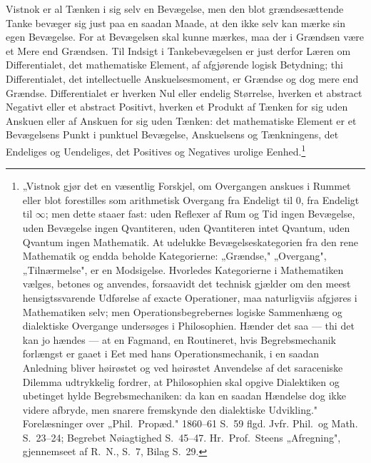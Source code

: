 \documentclass[12pt]{book}
\newcommand{\opage}[1]{\marginnote{\footnotesize\textit{[#1]}}}
\begin{document}
Vistnok er al Tænken i sig selv en Bevægelse, men den blot grændsesættende Tanke
bevæger sig just paa en saadan Maade, at den ikke selv kan mærke sin egen Bevægelse.
For at Bevægelsen skal kunne mærkes, maa der i Grændsen være et Mere end Grændsen. Til
Indsigt i Tankebevægelsen er just derfor Læren om Differentialet, det mathematiske
Element, af afgjørende logisk Betydning; thi Differentialet, det intellectuelle
Anskuelsesmoment, er Grændse og dog mere end Grændse. Differentialet er hverken Nul
eller endelig Størrelse, hverken et abstract Negativt eller et abstract Positivt,
hverken et Produkt af Tænken for sig uden Anskuen eller af Anskuen for sig uden Tænken:
det mathematiske Element er
\opage{23} et Bevægelsens Punkt i punktuel Bevægelse, Anskuelsens og Tænkningens, det Endeliges
og Uendeliges, det Positives og Negatives urolige Eenhed.\footnote{„Vistnok gjør det
en væsentlig Forskjel, om Overgangen anskues i Rummet eller blot forestilles som
arithmetisk Overgang fra Endeligt til $0$, fra Endeligt til $\infty$; men dette staaer
fast: uden Reflexer af Rum og Tid ingen Bevægelse, uden Bevægelse ingen Qvantiteren,
uden Qvantiteren intet Qvantum, uden Qvantum ingen Mathematik. At udelukke
Bevægelseskategorien fra den rene Mathematik og endda beholde Kategorierne: „Grændse,"
„Overgang", „Tilnærmelse", er en Modsigelse. Hvorledes Kategorierne i Mathematiken
vælges, betones og anvendes, forsaavidt det technisk gjælder om den meest
hensigtssvarende Udførelse af exacte Operationer, maa naturligviis afgjøres i
Mathematiken selv; men Operationsbegrebernes logiske Sammenhæng og dialektiske
Overgange undersøges i Philosophien. Hænder det saa --- thi det kan jo hændes --- at en
Fagmand, en Routineret, hvis Begrebsmechanik forlængst er gaaet i Eet med hans
Operationsmechanik, i en saadan Anledning bliver høirøstet og ved høirøstet Anvendelse
af det saraceniske Dilemma udtrykkelig fordrer, at Philosophien skal opgive Dialektiken
og ubetinget hylde Begrebsmechaniken: da kan en saadan Hændelse dog ikke videre
afbryde, men snarere fremskynde den dialektiske Udvikling." Forelæsninger over „Phil.\
Propæd." 1860--61 S.~59 flgd. Jvfr. Phil.\ og Math. S.~23--24; Begrebet Nøiagtighed
S.~45--47. Hr.\ Prof.\ Steens „Afregning", gjennemseet af R.\ N., S.~7, Bilag S.~29.}
\end{document}
